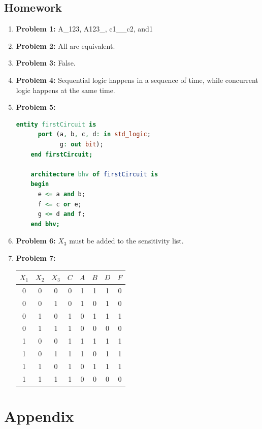 \documentclass{article}
\begin{document}
\subsection*{Homework}
\begin{enumerate}
  \item \textbf{Problem 1:} A\_123, A123\_, c1\_\_c2, and1
  \item \textbf{Problem 2:} All are equivalent.
  \item \textbf{Problem 3:} False.
  \item \textbf{Problem 4:} Sequential logic happens in a sequence of time, while concurrent logic happens at the same time.
  \item \textbf{Problem 5:} 
  \begin{lstlisting}[language=VHDL]
    entity firstCircuit is
      port (a, b, c, d: in std_logic;
            g: out bit);
    end firstCircuit;

    architecture bhv of firstCircuit is
    begin
      e <= a and b;
      f <= c or e;
      g <= d and f;
    end bhv;
  \end{lstlisting}
  \item \textbf{Problem 6:} $X_3$ must be added to the sensitivity list.
  \item \textbf{Problem 7:} \\
  \begin{tabular}{|c|c|c|c|c|c|c|c|}
    \hline
    $X_1$ & $X_2$ & $X_3$ & $C$ & $A$ & $B$ & $D$ & $F$ \\
    \hline
    0 & 0 & 0 & 0 & 1 & 1 & 1 & 0 \\
    \hline
    0 & 0 & 1 & 0 & 1 & 0 & 1 & 0 \\
    \hline
    0 & 1 & 0 & 1 & 0 & 1 & 1 & 1 \\
    \hline
    0 & 1 & 1 & 1 & 0 & 0 & 0 & 0 \\
    \hline
    1 & 0 & 0 & 1 & 1 & 1 & 1 & 1 \\
    \hline
    1 & 0 & 1 & 1 & 1 & 0 & 1 & 1 \\
    \hline 
    1 & 1 & 0 & 1 & 0 & 1 & 1 & 1 \\
    \hline
    1 & 1 & 1 & 1 & 0 & 0 & 0 & 0 \\
    \hline
  \end{tabular}
\end{enumerate}

\section*{Appendix}
\end{document}
